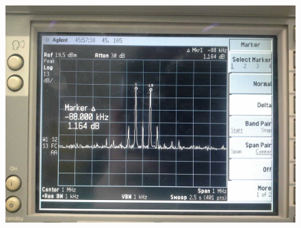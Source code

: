 
\FloatBarrier\begin{figure}[!h]
\centering
\includegraphics[scale=0.25]{../Grafiken/Frequenzspektrum_b_AmpModuliertTraegerunterdrueckung_1.jpg}
\caption{\label{fig:frequenzspektrum_b_ampmodulierttraegerunterdrueckung_1}}
\end{figure}
\FloatBarrier